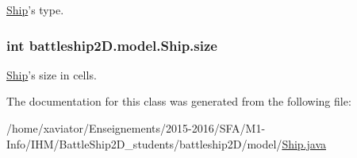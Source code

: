 \hyperlink{classbattleship2D_1_1model_1_1Ship}{Ship}'s type. 

\hypertarget{classbattleship2D_1_1model_1_1Ship_a8c1f963c60a57e54b2600e9ee3a5aef6}{
\subsubsection[{size}]{\setlength{\rightskip}{0pt plus 5cm}int battleship2\-D.\-model.\-Ship.\-size\hspace{0.3cm}{\ttfamily [private]}}}\label{classbattleship2D_1_1model_1_1Ship_a8c1f963c60a57e54b2600e9ee3a5aef6}


\hyperlink{classbattleship2D_1_1model_1_1Ship}{Ship}'s size in cells. 



The documentation for this class was generated from the following file\-:\begin{DoxyCompactItemize}
\item 
/home/xaviator/\-Enseignements/2015-\/2016/\-S\-F\-A/\-M1-\/\-Info/\-I\-H\-M/\-Battle\-Ship2\-D\-\_\-students/battleship2\-D/model/\hyperlink{Ship_8java}{Ship.\-java}\end{DoxyCompactItemize}
